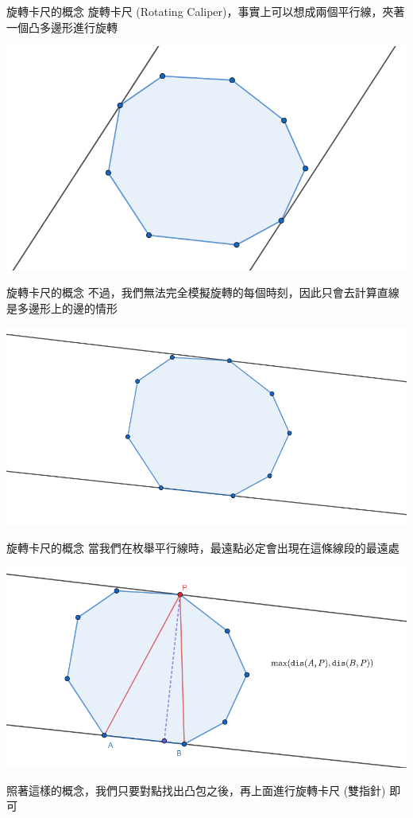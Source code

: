 \documentclass[aspectratio=169]{beamer}
\begin{document}
\begin{frame}[fragile]{旋轉卡尺的概念}
    旋轉卡尺 (Rotating Caliper)，事實上可以想成兩個平行線，夾著一個凸多邊形進行旋轉
    \begin{center}
        \includegraphics[scale=0.3]{images/rotating_caliper.png}
    \end{center}
\end{frame}

\begin{frame}[fragile]{旋轉卡尺的概念}
    不過，我們無法完全模擬旋轉的每個時刻，因此只會去計算直線是多邊形上的邊的情形
    \begin{center}
        \includegraphics[scale=0.3]{images/rotating_caliper_2.png}
    \end{center}
\end{frame}

\begin{frame}[fragile]{旋轉卡尺的概念}
    當我們在枚舉平行線時，最遠點必定會出現在這條線段的最遠處
    \begin{center}
        \includegraphics[scale=0.3]{images/farthest pair of points.png}
    \end{center}
    照著這樣的概念，我們只要對點找出凸包之後，再上面進行旋轉卡尺 (雙指針) 即可
\end{frame}
\end{document}
